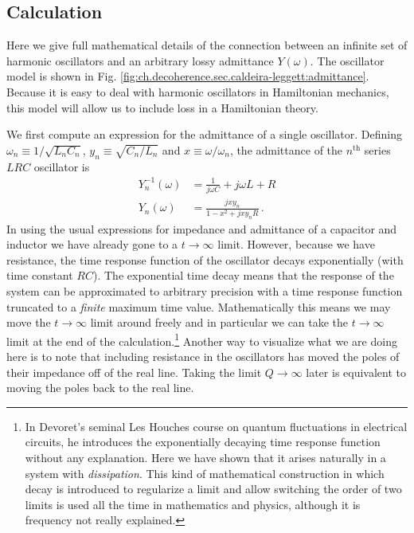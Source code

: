 \subsection{Calculation}

Here we give full mathematical details of the connection between an infinite set of harmonic oscillators and an arbitrary lossy admittance $Y(\omega)$.
The oscillator model is shown in Fig. \ref{fig:ch.decoherence.sec.caldeira-leggett:admittance}.
Because it is easy to deal with harmonic oscillators in Hamiltonian mechanics, this model will allow us to include loss in a Hamiltonian theory.


We first compute an expression for the admittance of a single oscillator.
Defining $\omega_n \equiv 1/\sqrt{L_n C_n}$, $y_n \equiv \sqrt{C_n / L_n}$ and $x \equiv \omega / \omega_n$, the admittance of the $n^{\text{th}}$ series $LRC$ oscillator is
\begin{align}
Y_n^{-1}(\omega) &= \frac{1}{j \omega C} + j \omega L + R \\
Y_n(\omega) &= \frac{j x y_n}{1 - x^2 + j x y_n R} \, .
\end{align}
In using the usual expressions for impedance and admittance of a capacitor and inductor we have already gone to a $t \rightarrow \infty$ limit.
However, because we have resistance, the time response function of the oscillator decays exponentially (with time constant $RC$).
The exponential time decay means that the response of the system can be approximated to arbitrary precision with a time response function truncated to a \emph{finite} maximum time value.
Mathematically this means we may move the $t \rightarrow \infty$ limit around freely and in particular we can take the $t \rightarrow \infty$ limit at the end of the calculation.\footnote{In Devoret's seminal Les Houches course on quantum fluctuations in electrical circuits, he introduces the exponentially decaying time response function without any explanation. Here we have shown that it arises naturally in a system with \emph{dissipation}. This kind of mathematical construction in which decay is introduced to regularize a limit and allow switching the order of two limits is used all the time in mathematics and physics, although it is frequency not really explained.}
Another way to visualize what we are doing here is to note that including resistance in the oscillators has moved the poles of their impedance off of the real line.
Taking the limit $Q \rightarrow \infty$ later is equivalent to moving the poles back to the real line.

